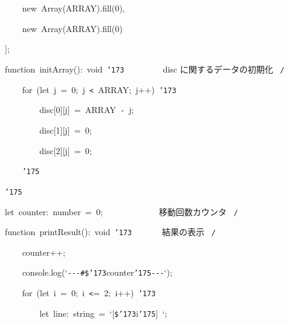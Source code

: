 \documentclass{article}
\begin{document}
\noindent
\mbox{}{\tt\mc \ \ \ \ }new{\tt\mc \ }Array(ARRAY).fill(0),

\noindent
\mbox{}{\tt\mc \ \ \ \ }new{\tt\mc \ }Array(ARRAY).fill(0)

\noindent
\mbox{}];

\noindent
\mbox{}\hfill

\noindent
\mbox{}function{\tt\mc \ }initArray():{\tt\mc \ }void{\tt\mc \ }{\tt\char'173}{\tt\mc \ \ \ \ \ \ \ \ }\rm\mc {\tt /}{\tt *}\  {}disc に関するデータの初期化 \hfill \rm\mc \ {\tt *}{\tt /}
\tt\mc 

\noindent
\mbox{}{\tt\mc \ \ \ \ }for{\tt\mc \ }(let{\tt\mc \ }j{\tt\mc \ }={\tt\mc \ }0;{\tt\mc \ }j{\tt\mc \ }{\tt <}{\tt\mc \ }ARRAY;{\tt\mc \ }j++){\tt\mc \ }{\tt\char'173}

\noindent
\mbox{}{\tt\mc \ \ \ \ \ \ \ \ }disc[0][j]{\tt\mc \ }={\tt\mc \ }ARRAY{\tt\mc \ }{\tt -}{\tt\mc \ }j;

\noindent
\mbox{}{\tt\mc \ \ \ \ \ \ \ \ }disc[1][j]{\tt\mc \ }={\tt\mc \ }0;

\noindent
\mbox{}{\tt\mc \ \ \ \ \ \ \ \ }disc[2][j]{\tt\mc \ }={\tt\mc \ }0;

\noindent
\mbox{}{\tt\mc \ \ \ \ }{\tt\char'175}

\noindent
\mbox{}{\tt\char'175}

\noindent
\mbox{}\hfill

\noindent
\mbox{}let{\tt\mc \ }counter:{\tt\mc \ }number{\tt\mc \ }={\tt\mc \ }0;{\tt\mc \ \ \ \ \ \ \ \ \ \ \ \ }\rm\mc {\tt /}{\tt *}\  {}移動回数カウンタ \hfill \rm\mc \ {\tt *}{\tt /}
\tt\mc 

\noindent
\mbox{}\hfill

\noindent
\mbox{}function{\tt\mc \ }printResult():{\tt\mc \ }void{\tt\mc \ }{\tt\char'173}{\tt\mc \ \ \ \ \ \ }\rm\mc {\tt /}{\tt *}\  {}結果の表示 \hfill \rm\mc \ {\tt *}{\tt /}
\tt\mc 

\noindent
\mbox{}{\tt\mc \ \ \ \ }counter++;

\noindent
\mbox{}{\tt\mc \ \ \ \ }console.log(`{\tt -}{\tt -}{\tt -}{\tt\#}{\tt\$}{\tt\char'173}counter{\tt\char'175}{\tt -}{\tt -}{\tt -}`);

\noindent
\mbox{}{\tt\mc \ \ \ \ }for{\tt\mc \ }(let{\tt\mc \ }i{\tt\mc \ }={\tt\mc \ }0;{\tt\mc \ }i{\tt\mc \ }{\tt <}={\tt\mc \ }2;{\tt\mc \ }i++){\tt\mc \ }{\tt\char'173}

\noindent
\mbox{}{\tt\mc \ \ \ \ \ \ \ \ }let{\tt\mc \ }line:{\tt\mc \ }string{\tt\mc \ }={\tt\mc \ }`[{\tt\$}{\tt\char'173}i{\tt\char'175}]{\tt\mc \ }`;
\end{document}
